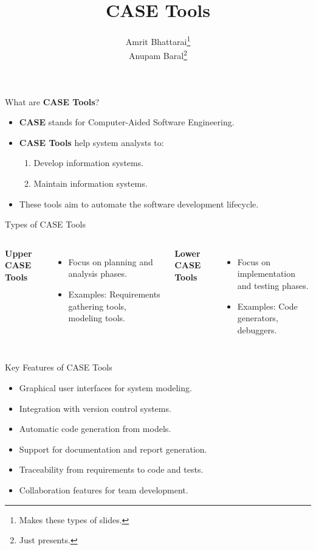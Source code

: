 \documentclass[14pt, aspectratio=169]{beamer}
\title{CASE Tools}
\author{Amrit Bhattarai\thanks{Makes these types of slides.}\\Anupam Baral\thanks{Just presents.}}
\begin{document}
\maketitle

\begin{frame}{What are \textbf{CASE Tools}?}
	\begin{itemize}
		\item<1-> \textbf{CASE} stands for \textcolor{emphasis}{Computer-Aided Software Engineering}.
		\item<1-> \textbf{CASE Tools} help system analysts to:
			\begin{enumerate}
				\item<2-> Develop information systems.
				\item<2-> Maintain information systems.
			\end{enumerate}
		\item<3-> These tools aim to \textcolor{emphasis}{automate} the software development lifecycle.
	\end{itemize}
\end{frame}

\begin{frame}{Types of CASE Tools}
	\begin{columns}

		\textbf{Upper CASE Tools} \pause
		\begin{itemize}
			\item Focus on planning and analysis phases. \pause
			\item Examples: Requirements gathering tools, modeling tools. \pause
		\end{itemize}

		\textbf{Lower CASE Tools} \pause
		\begin{itemize}
			\item Focus on implementation and testing phases. \pause
			\item Examples: Code generators, debuggers. \pause
		\end{itemize}

	\end{columns}
\end{frame}

\begin{frame}{Key Features of CASE Tools}
	\begin{itemize}
		\item<1-> Graphical user interfaces for system modeling. \pause
		\item<2-> Integration with version control systems. \pause
		\item<3-> Automatic code generation from models. \pause
		\item<4-> Support for documentation and report generation. \pause
		\item<5-> Traceability from requirements to code and tests. \pause
		\item<6-> Collaboration features for team development.
	\end{itemize}
\end{frame}
\end{document}
